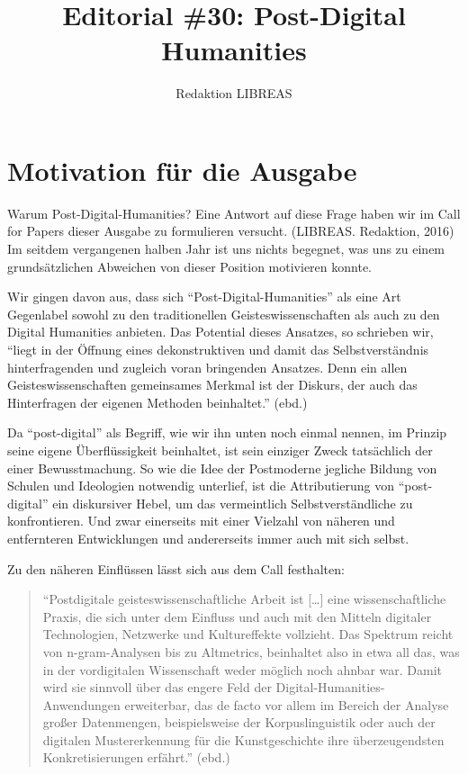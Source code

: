 \documentclass[a4paper,
fontsize=11pt,
oneside,
numbers=noperiodatend,
parskip=half-,
bibliography=totoc,
final
]{scrartcl}
\title{\LARGE{Editorial \#30: Post-Digital Humanities}} %
\author{Redaktion LIBREAS} %
\date{}
\begin{document}
\maketitle
\thispagestyle{fancyplain} 


\section*{Motivation für die
Ausgabe}\label{motivation-fuxfcr-die-ausgabe}

Warum Post-Digital-Humanities? Eine Antwort auf diese Frage haben wir im
Call for Papers dieser Ausgabe zu formulieren versucht. (LIBREAS.
Redaktion, 2016) Im seitdem vergangenen halben Jahr ist uns nichts
begegnet, was uns zu einem grundsätzlichen Abweichen von dieser Position
motivieren konnte.

Wir gingen davon aus, dass sich \enquote{Post-Digital-Humanities} als
eine Art Gegenlabel sowohl zu den traditionellen Geisteswissenschaften
als auch zu den Digital Humanities anbieten. Das Potential dieses
Ansatzes, so schrieben wir, \enquote{liegt in der Öffnung eines
dekonstruktiven und damit das Selbstverständnis hinterfragenden und
zugleich voran bringenden Ansatzes. Denn ein allen Geisteswissenschaften
gemeinsames Merkmal ist der Diskurs, der auch das Hinterfragen der
eigenen Methoden beinhaltet.} (ebd.)

Da \enquote{post-digital} als Begriff, wie wir ihn unten noch einmal
nennen, im Prinzip seine eigene Überflüssigkeit beinhaltet, ist sein
einziger Zweck tatsächlich der einer Bewusstmachung. So wie die Idee der
Postmoderne jegliche Bildung von Schulen und Ideologien notwendig
unterlief, ist die Attributierung von \enquote{post-digital} ein
diskursiver Hebel, um das vermeintlich Selbstverständliche zu
konfrontieren. Und zwar einerseits mit einer Vielzahl von näheren und
entfernteren Entwicklungen und andererseits immer auch mit sich selbst.

Zu den näheren Einflüssen lässt sich aus dem Call festhalten:

\begin{quote}
\enquote{Postdigitale geisteswissenschaftliche Arbeit ist {[}\ldots{}{]}
eine wissenschaftliche Praxis, die sich unter dem Einfluss und auch mit
den Mitteln digitaler Technologien, Netzwerke und Kultureffekte
vollzieht. Das Spektrum reicht von n-gram-Analysen bis zu Altmetrics,
beinhaltet also in etwa all das, was in der vordigitalen Wissenschaft
weder möglich noch ahnbar war. Damit wird sie sinnvoll über das engere
Feld der Digital-Humanities-Anwendungen erweiterbar, das de facto vor
allem im Bereich der Analyse großer Datenmengen, beispielsweise der
Korpuslinguistik oder auch der digitalen Mustererkennung für die
Kunstgeschichte ihre überzeugendsten Konkretisierungen erfährt.} (ebd.)
\end{quote}
\end{document}
